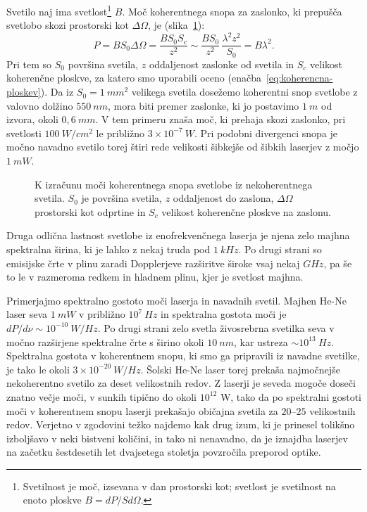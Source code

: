 Svetilo naj ima svetlost\footnote{Svetilnost je moč, izsevana v dan 
prostorski kot; svetlost je svetilnost na enoto ploskve
$B= dP/Sd\Omega$.} $B$.  
Moč koherentnega snopa za zaslonko, ki prepušča svetlobo skozi prostorski kot 
$\Delta\Omega$, je (slika~\ref{fig:svetlost}):
\begin{equation}
P=BS_{0}\Delta \Omega =\frac{BS_{0}S_{c}}{z^{2}}\sim \frac{BS_{0}}{z^{2}}\,
\frac{\lambda ^{2}z^{2}}{S_{0}}=B\lambda ^{2}.
\label{5.21}
\end{equation}
Pri tem so $S_{0}$ površina svetila, $z$ oddaljenost zaslonke od svetila in
$S_{c}$ velikost koherenčne ploskve, za katero smo uporabili oceno 
(enačba~\ref{eq:koherencna-ploskev}). Da iz $S_0=1~\si{mm}^2$ velikega svetila 
dosežemo koherentni snop svetlobe z valovno dolžino $550~\si{nm}$, 
mora biti premer zaslonke, ki jo postavimo $1~\si{m}$ od izvora, 
okoli $0,6~\si{mm}$. V tem primeru znaša 
moč, ki prehaja skozi zaslonko, pri svetlosti $100~\si{W/cm^{2}}$ 
le približno $3\times 10^{-7}~\si{W}$.
Pri podobni divergenci snopa je močno navadno svetilo torej štiri rede
velikosti šibkejše od šibkih laserjev z močjo $1~\si{mW}$. 
\begin{figure}[ht]
\centering
\def\svgwidth{100truemm} 

\caption{K izračunu moči koherentnega snopa svetlobe iz nekoherentnega svetila. $S_0$
je površina svetila, $z$ oddaljenost do zaslona, $\Delta \Omega$ prostorski kot odprtine
 in $S_c$ velikost koherenčne ploskve na zaslonu.}
\label{fig:svetlost}
\end{figure}

Druga odlična lastnost svetlobe iz enofrekvenčnega laserja je njena zelo majhna
spektralna širina, ki je lahko z nekaj truda pod $1~\si{kHz}$. Po drugi strani so emisijske 
črte v plinu zaradi Dopplerjeve razširitve široke vsaj nekaj $\si{GHz}$, 
pa še to le v razmeroma redkem in hladnem plinu, kjer je svetlost majhna.

Primerjajmo spektralno gostoto moči laserja in navadnih svetil. Majhen He-Ne
laser seva $1~\si{mW}$ v približno $10^{7}~\si{Hz}$ in spektralna gostota
moči je $dP/d\nu \sim 10^{-10}~\si{W/Hz}$. Po drugi strani zelo svetla 
živosrebrna svetilka seva v močno razširjene spektralne črte s širino okoli 
$10~\si{nm}$, kar ustreza $\sim 10^{13}~\si{Hz}$. 
Spektralna gostota v koherentnem snopu, ki smo ga pripravili iz
navadne svetilke, je tako le okoli $3\times 10^{-20}~\si{W/Hz}$. Šolski
He-Ne laser torej prekaša najmočnejše nekoherentno svetilo za deset 
velikostnih redov. Z laserji je seveda mogoče doseči znatno večje
moči, v sunkih tipično do okoli $10^{12}$ W, tako da po spektralni gostoti moči v
koherentnem snopu laserji prekašajo običajna svetila za $20$--$25$
velikostnih redov. Verjetno v zgodovini težko najdemo kak drug izum, 
ki je prinesel tolikšno izboljšavo v neki bistveni količini, in tako ni 
nenavadno, da je iznajdba laserjev na začetku šestdesetih let dvajsetega stoletja povzročila preporod optike.


